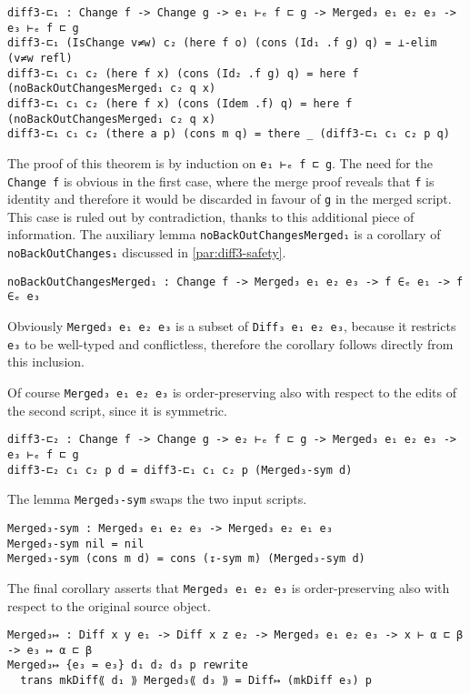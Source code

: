 \documentclass[../Thesis.tex]{subfiles}
\begin{document}
\begin{verbatim}
diff3-⊏₁ : Change f -> Change g -> e₁ ⊢ₑ f ⊏ g -> Merged₃ e₁ e₂ e₃ -> e₃ ⊢ₑ f ⊏ g
diff3-⊏₁ (IsChange v≠w) c₂ (here f o) (cons (Id₁ .f g) q) = ⊥-elim (v≠w refl)
diff3-⊏₁ c₁ c₂ (here f x) (cons (Id₂ .f g) q) = here f (noBackOutChangesMerged₁ c₂ q x)
diff3-⊏₁ c₁ c₂ (here f x) (cons (Idem .f) q) = here f (noBackOutChangesMerged₁ c₂ q x)
diff3-⊏₁ c₁ c₂ (there a p) (cons m q) = there _ (diff3-⊏₁ c₁ c₂ p q)
\end{verbatim}
  
	The proof of this theorem is by induction on \texttt{e₁ ⊢ₑ f ⊏ g}.
	The need for the \texttt{Change f} is obvious in the first case, where
	the merge proof reveals that \texttt{f} is identity and therefore it would be 
	discarded	in favour of \texttt{g} in the merged script.
	This case is ruled out by contradiction, thanks to this additional piece
	of information.
	The auxiliary lemma \texttt{noBackOutChangesMerged₁} is a corollary 
	of \texttt{noBackOutChanges₁} discussed in \ref{par:diff3-safety}.
		
\begin{verbatim}
noBackOutChangesMerged₁ : Change f -> Merged₃ e₁ e₂ e₃ -> f ∈ₑ e₁ -> f ∈ₑ e₃
\end{verbatim}
	
	Obviously \texttt{Merged₃ e₁ e₂ e₃} is a subset of \texttt{Diff₃ e₁ e₂ e₃}, 
	because it restricts \texttt{e₃} to be well-typed and conflictless, therefore 
	the corollary follows directly from this inclusion.
	
	Of course \texttt{Merged₃ e₁ e₂ e₃} is order-preserving also with respect
	to the edits of the second script, since it is symmetric.
	
\begin{verbatim}
diff3-⊏₂ : Change f -> Change g -> e₂ ⊢ₑ f ⊏ g -> Merged₃ e₁ e₂ e₃ -> e₃ ⊢ₑ f ⊏ g
diff3-⊏₂ c₁ c₂ p d = diff3-⊏₁ c₁ c₂ p (Merged₃-sym d)
\end{verbatim}
	
	The lemma \texttt{Merged₃-sym} swaps the two input scripts.
\begin{verbatim}
Merged₃-sym : Merged₃ e₁ e₂ e₃ -> Merged₃ e₂ e₁ e₃
Merged₃-sym nil = nil
Merged₃-sym (cons m d) = cons (↧-sym m) (Merged₃-sym d)
\end{verbatim}	
	
	The final corollary asserts that \texttt{Merged₃ e₁ e₂ e₃} is 
	order-preserving also with respect to 	the original source object.

\begin{verbatim}
Merged₃↦ : Diff x y e₁ -> Diff x z e₂ -> Merged₃ e₁ e₂ e₃ -> x ⊢ α ⊏ β -> e₃ ↦ α ⊏ β
Merged₃↦ {e₃ = e₃} d₁ d₂ d₃ p rewrite
  trans mkDiff⟪ d₁ ⟫ Merged₃⟪ d₃ ⟫ = Diff↦ (mkDiff e₃) p
\end{verbatim}
\end{document}

